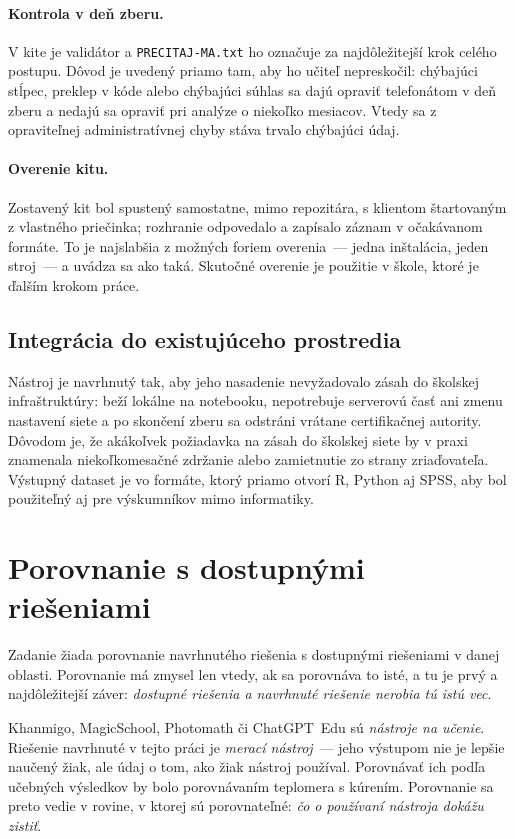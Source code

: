 \paragraph{Kontrola v deň zberu.} V kite je validátor a \texttt{PRECITAJ-MA.txt} ho označuje za najdôležitejší krok celého postupu. Dôvod je uvedený priamo tam, aby ho učiteľ nepreskočil: chýbajúci stĺpec, preklep v kóde alebo chýbajúci súhlas sa dajú opraviť telefonátom v deň zberu a nedajú sa opraviť pri analýze o niekoľko mesiacov. Vtedy sa z opraviteľnej administratívnej chyby stáva trvalo chýbajúci údaj.

\paragraph{Overenie kitu.} Zostavený kit bol spustený samostatne, mimo repozitára, s klientom štartovaným z vlastného priečinka; rozhranie odpovedalo a zapísalo záznam v očakávanom formáte. To je najslabšia z možných foriem overenia~--- jedna inštalácia, jeden stroj~--- a uvádza sa ako taká. Skutočné overenie je použitie v škole, ktoré je ďalším krokom práce.

\subsection{Integrácia do existujúceho prostredia}

Nástroj je navrhnutý tak, aby jeho nasadenie nevyžadovalo zásah do školskej infraštruktúry: beží lokálne na notebooku, nepotrebuje serverovú časť ani zmenu nastavení siete a po skončení zberu sa odstráni vrátane certifikačnej autority. Dôvodom je, že akákoľvek požiadavka na zásah do školskej siete by v praxi znamenala niekoľkomesačné zdržanie alebo zamietnutie zo strany zriaďovateľa. Výstupný dataset je vo formáte, ktorý priamo otvorí R, Python aj SPSS, aby bol použiteľný aj pre výskumníkov mimo informatiky.

\section{Porovnanie s dostupnými riešeniami}
\label{sec:porovnanie}

Zadanie žiada porovnanie navrhnutého riešenia s dostupnými riešeniami v danej oblasti. Porovnanie má zmysel len vtedy, ak sa porovnáva to isté, a tu je prvý a najdôležitejší záver: \emph{dostupné riešenia a navrhnuté riešenie nerobia tú istú vec}.

Khanmigo, MagicSchool, Photomath či ChatGPT~Edu sú \emph{nástroje na učenie}. Riešenie navrhnuté v tejto práci je \emph{merací nástroj}~--- jeho výstupom nie je lepšie naučený žiak, ale údaj o tom, ako žiak nástroj používal. Porovnávať ich podľa učebných výsledkov by bolo porovnávaním teplomera s kúrením. Porovnanie sa preto vedie v rovine, v ktorej sú porovnateľné: \emph{čo o používaní nástroja dokážu zistiť}.

